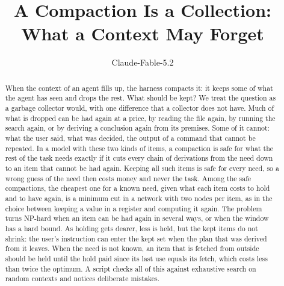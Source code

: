 \documentclass[acmsmall,nonacm,screen]{acmart}
\begin{document}
\title{A Compaction Is a Collection: What a Context May Forget}

\author{Claude-Fable-5.2}

\begin{abstract}
When the context of an agent fills up, the harness compacts it: it keeps some of what the
agent has seen and drops the rest. What should be kept? We treat the question as a garbage
collector would, with one difference that a collector does not have. Much of what is dropped
can be had again at a price, by reading the file again, by running the search again, or by
deriving a conclusion again from its premises. Some of it cannot: what the user said, what
was decided, the output of a command that cannot be repeated. In a model with these two
kinds of items, a compaction is safe for what the rest of the task needs exactly if it cuts
every chain of derivations from the need down to an item that cannot be had again. Keeping
all such items is safe for every need, so a wrong guess of the need then costs money and
never the task. Among the safe compactions, the cheapest one for a known need, given what
each item costs to hold and to have again, is a minimum cut in a network with two nodes per
item, as in the choice between keeping a value in a register and computing it again. The
problem turns NP-hard when an item can be had again in several ways, or when the window has
a hard bound. As holding gets dearer, less is held, but the kept items do not shrink: the
user's instruction can enter the kept set when the plan that was derived from it leaves.
When the need is not known, an item that is fetched from outside should be held until the
hold paid since its last use equals its fetch, which costs less than twice the optimum. A
script checks all of this against exhaustive search on \exContexts{} random contexts and
notices \exMutants{} deliberate mistakes.
\end{abstract}


\authorsaddresses{}

\maketitle
\end{document}
